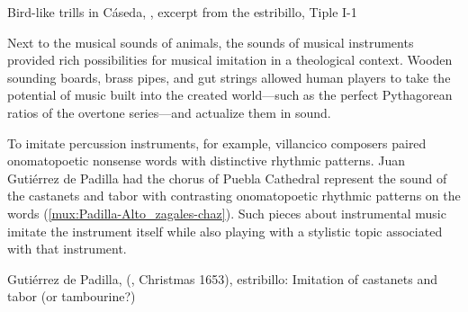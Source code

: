 {Bird-like trills in Cáseda, , excerpt from the
estribillo, Tiple I-1}

Next to the musical sounds of animals, the sounds of musical instruments
provided rich possibilities for musical imitation in a theological context.
Wooden sounding boards, brass pipes, and gut strings allowed human players to
take the potential of music built into the created world---such as the perfect
Pythagorean ratios of the overtone series---and actualize them in sound.

To imitate percussion instruments, for example, villancico composers paired
onomatopoetic nonsense words with distinctive rhythmic patterns.
Juan Gutiérrez de Padilla had the chorus of Puebla Cathedral represent the
sound of the castanets and tabor with contrasting onomatopoetic rhythmic
patterns on the words  (\cref{mux:Padilla-Alto_zagales-chaz}).
Such pieces about instrumental music imitate the instrument itself while also
playing with a stylistic topic associated with that instrument.

{Gutiérrez de Padilla, 
(, Christmas 1653), estribillo: Imitation of castanets
and tabor (or tambourine?)}  %

